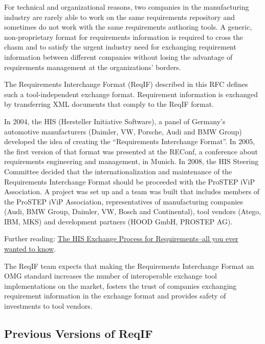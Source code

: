 For technical and organizational reasons, two companies in the manufacturing industry are rarely able to work on the same requirements repository and sometimes do not work with the same requirements authoring tools.  A generic, non-proprietary format for requirements information is required to cross the chasm and to satisfy the urgent industry need for exchanging requirement information between different companies without losing the advantage of requirements management at the organizations' borders.

The Requirements Interchange Format (ReqIF) described in this RFC defines such a tool-independent exchange format.  Requirement information is exchanged by transferring XML documents that comply to the ReqIF format.

In 2004, the HIS (Hersteller Initiative Software), a panel of Germany's automotive manufacturers (Daimler, VW, Porsche, Audi and BMW Group) developed the idea of creating the ``Requirements Interchange Format''.  In 2005, the first version of that format was presented at the REConf, a conference about requirements engineering and management, in Munich.  In 2008, the HIS Steering Committee decided that the internationalization and maintenance of the Requirements Interchange Format should be proceeded with the ProSTEP iViP Association.  A project was set up and a team was built that includes members of the ProSTEP iViP Association, representatives of manufacturing companies (Audi, BMW  Group, Daimler, VW, Bosch and Continental), tool vendors (Atego, IBM, MKS) and development partners (HOOD GmbH, PROSTEP AG).

\begin{info}
Further reading: \href{http://formalmind.com/de/blog/his-exchange-process-requirements-all-you-ever-wanted-know}{The HIS Exchange Process for Requirements–all you ever wanted to know}.
\end{info}

The ReqIF team expects that making the Requirements Interchange Format an OMG standard increases the number of interoperable exchange tool implementations on the market, fosters the trust of companies exchanging requirement information in the exchange format and provides safety of investments to tool vendors.

\subsection{Previous Versions of ReqIF}
\label{sec:RIF}

